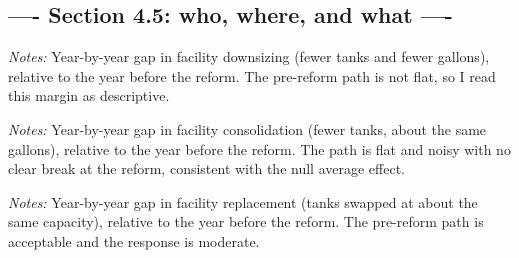 \documentclass[
  12pt,
]{article}
\begin{document}
\subsection{---- Section 4.5: who, where, and what
----}\label{section-4.5-who-where-and-what--}

\clearpage
\null\vfill
\begin{center}
\label{fig-es-downsize}
\par\vspace{8pt}
\par\vspace{8pt}
\begin{minipage}{0.85\textwidth}\small\textit{Notes:} Year-by-year gap in facility downsizing (fewer tanks and fewer gallons), relative to the year before the reform. The pre-reform path is not flat, so I read this margin as descriptive.\end{minipage}
\end{center}
\vfill\clearpage

\clearpage
\null\vfill
\begin{center}
\label{fig-es-consolidate}
\par\vspace{8pt}
\par\vspace{8pt}
\begin{minipage}{0.85\textwidth}\small\textit{Notes:} Year-by-year gap in facility consolidation (fewer tanks, about the same gallons), relative to the year before the reform. The path is flat and noisy with no clear break at the reform, consistent with the null average effect.\end{minipage}
\end{center}
\vfill\clearpage

\clearpage
\null\vfill
\begin{center}
\label{fig-es-replace}
\par\vspace{8pt}
\par\vspace{8pt}
\begin{minipage}{0.85\textwidth}\small\textit{Notes:} Year-by-year gap in facility replacement (tanks swapped at about the same capacity), relative to the year before the reform. The pre-reform path is acceptable and the response is moderate.\end{minipage}
\end{center}
\vfill\clearpage
\end{document}
